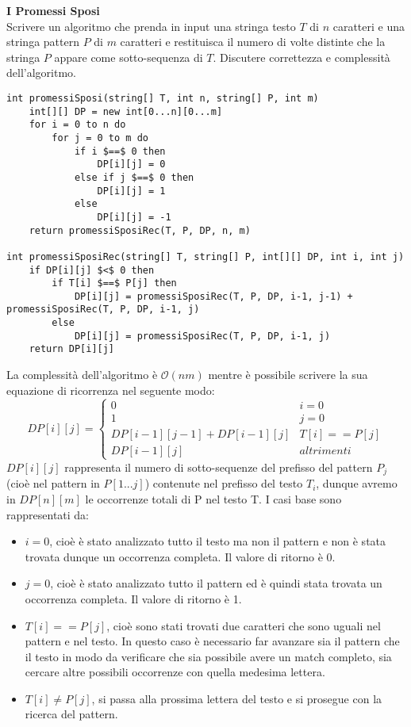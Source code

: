 \documentclass[../cheatSheetAlgoritmi.tex]{subfiles}
\begin{document}
\bigskip
\textbf{I Promessi Sposi}\\
Scrivere un algoritmo che prenda in input una stringa testo $T$ di $n$ caratteri e una stringa pattern $P$ di $m$ caratteri e restituisca il numero di volte distinte che la stringa $P$ appare come sotto-sequenza di $T$. Discutere correttezza e complessità dell'algoritmo.
\begin{lstlisting}[caption=Sottosequenze di un pattern in un testo (Promessi Sposi)]
int promessiSposi(string[] T, int n, string[] P, int m)
	int[][] DP = new int[0...n][0...m]
	for i = 0 to n do
		for j = 0 to m do
			if i $==$ 0 then
				DP[i][j] = 0
			else if j $==$ 0 then
				DP[i][j] = 1
			else 
				DP[i][j] = -1
	return promessiSposiRec(T, P, DP, n, m)
	
int promessiSposiRec(string[] T, string[] P, int[][] DP, int i, int j)
	if DP[i][j] $<$ 0 then
		if T[i] $==$ P[j] then
			DP[i][j] = promessiSposiRec(T, P, DP, i-1, j-1) + promessiSposiRec(T, P, DP, i-1, j)
		else
			DP[i][j] = promessiSposiRec(T, P, DP, i-1, j)
	return DP[i][j]
\end{lstlisting}
\newpage
La complessità dell'algoritmo è $\mathcal{O}(nm)$ mentre è possibile scrivere la sua equazione di ricorrenza nel seguente modo:
\begin{equation*}
  	DP[i][j] =\begin{cases}
    	0 & \text{$i = 0$}\\
    	1 & \text{$j = 0$}\\
    	DP[i-1][j-1] + DP[i-1][j] & \text{$T[i] == P[j]$}\\
    	DP[i-1][j] & \text{$altrimenti$}
  	\end{cases}
\end{equation*}
$DP[i][j]$ rappresenta il numero di sotto-sequenze del prefisso del pattern $P_{j}$ (cioè nel pattern in $P[1...j]$) contenute nel prefisso del testo $T_{i}$, dunque avremo in $DP[n][m]$ le occorrenze totali di P nel testo T. I casi base sono rappresentati da:
\begin{itemize}
	\item $i = 0$, cioè è stato analizzato tutto il testo ma non il pattern e non è stata trovata dunque un occorrenza completa. Il valore di ritorno è 0.
	\item $j = 0$, cioè è stato analizzato tutto il pattern ed è quindi stata trovata un occorrenza completa. Il valore di ritorno è 1.
	\item $T[i] == P[j]$, cioè sono stati trovati due caratteri che sono uguali nel pattern e nel testo. In questo caso è necessario far avanzare sia il pattern che il testo in modo da verificare che sia possibile avere un match completo, sia cercare altre possibili occorrenze con quella medesima lettera.
	\item $T[i] \neq P[j]$, si passa alla prossima lettera del testo e si prosegue con la ricerca del pattern.
\end{itemize}
\end{document}
